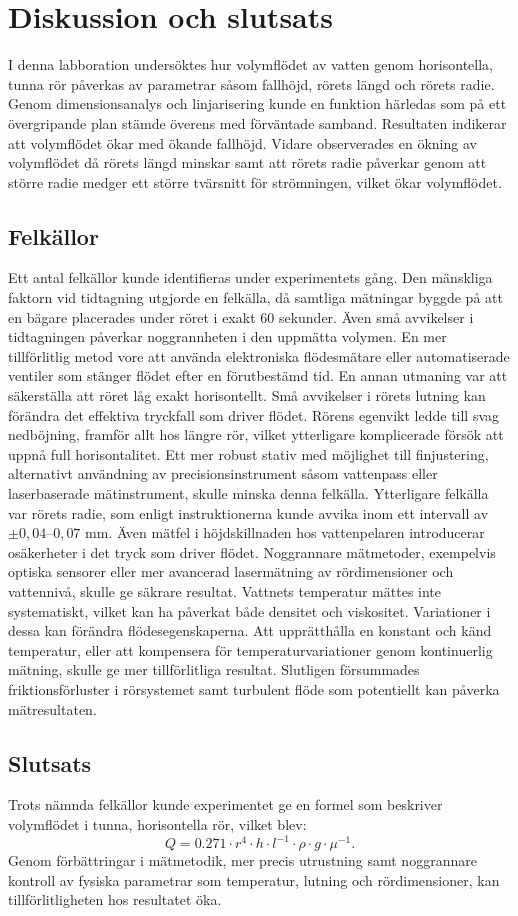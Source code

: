 \documentclass[a4paper,12pt]{article}
\begin{document}
\section{Diskussion och slutsats}
%
I denna labboration undersöktes hur volymflödet av vatten genom horisontella, tunna rör påverkas av parametrar såsom fallhöjd, rörets längd och rörets radie. Genom dimensionsanalys och linjarisering kunde en funktion härledas som på ett övergripande plan stämde överens med förväntade samband. Resultaten indikerar att volymflödet ökar med ökande fallhöjd. Vidare observerades en ökning av volymflödet då rörets längd minskar samt att rörets radie påverkar genom att större radie medger ett större tvärsnitt för strömningen, vilket ökar volymflödet.
%
\subsection{Felkällor}
Ett antal felkällor kunde identifieras under experimentets gång. Den mänskliga faktorn vid tidtagning utgjorde en felkälla, då samtliga mätningar byggde på att en bägare placerades under röret i exakt 60 sekunder. Även små avvikelser i tidtagningen påverkar noggrannheten i den uppmätta volymen. En mer tillförlitlig metod vore att använda elektroniska flödesmätare eller automatiserade ventiler som stänger flödet efter en förutbestämd tid.
%
En annan utmaning var att säkerställa att röret låg exakt horisontellt. Små avvikelser i rörets lutning kan förändra det effektiva tryckfall som driver flödet. Rörens egenvikt ledde till svag nedböjning, framför allt hos längre rör, vilket ytterligare komplicerade försök att uppnå full horisontalitet. Ett mer robust stativ med möjlighet till finjustering, alternativt användning av precisionsinstrument såsom vattenpass eller laserbaserade mätinstrument, skulle minska denna felkälla.
%
Ytterligare felkälla var rörets radie, som enligt instruktionerna kunde avvika inom ett intervall av $\pm 0,04$--$0,07$ mm. 
Även mätfel i höjdskillnaden hos vattenpelaren introducerar osäkerheter i det tryck som driver flödet. Noggrannare mätmetoder, exempelvis optiska sensorer eller mer avancerad lasermätning av rördimensioner och vattennivå, skulle ge säkrare resultat.
%
Vattnets temperatur mättes inte systematiskt, vilket kan ha påverkat både densitet och viskositet. Variationer i dessa kan förändra flödesegenskaperna. Att upprätthålla en konstant och känd temperatur, eller att kompensera för temperaturvariationer genom kontinuerlig mätning, skulle ge mer tillförlitliga resultat.
%
Slutligen försummades friktionsförluster i rörsystemet samt turbulent flöde som potentiellt kan påverka mätresultaten.
\subsection{Slutsats}
Trots nämnda felkällor kunde experimentet ge en formel som beskriver volymflödet i tunna, horisontella rör, vilket blev:
\[
Q = 0.271 \cdot r^4 \cdot h \cdot l^{-1} \cdot \rho \cdot g \cdot \mu^{-1}.
\]
Genom förbättringar i mätmetodik, mer precis utrustning samt noggrannare kontroll av fysiska parametrar som temperatur, lutning och rördimensioner, kan tillförlitligheten hos resultatet öka. 
%
\end{document}
